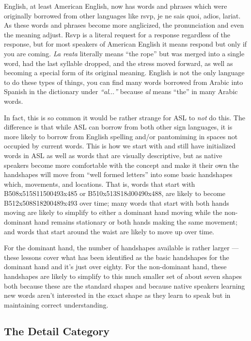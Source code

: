 \documentclass{article}
\begin{document}
English, at least American English, now has words and phrases which were originally borrowed from other languages like rsvp, je ne sais quoi, adios, lariat.
As these words and phrases become more anglicized, the pronunciation and even the meaning adjust.
Rsvp is a literal request for a response regardless of the response, but for most speakers of American English it means respond but only if you are coming.
\emph{La reata} literally means ``the rope'' but was merged into a single word, had the last syllable dropped, and the stress moved forward, as well as becoming a special form of its original meaning.
English is not the only language to do these types of things, you can find many words borrowed from Arabic into Spanish in the dictionary under \emph{``al$\ldots$''} because \emph{al} means ``the'' in many Arabic words.

In fact, this is so common it would be rather strange for ASL to \emph{not} do this.
The difference is that while ASL can borrow from both other sign languages, it is more likely to borrow from English spelling and/or pantomiming in spaces not occupied by current words.
This is how we start with and still have initialized words in ASL as well as words that are visually descriptive, but as native speakers become more comfortable with the concept and make it their own the handshapes will move from ``well formed letters'' into some basic handshapes which, movements, and locations.
That is, words that start with B508x515S11500493x485 or B510x513S18d00490x488, are likely to become B512x508S18200489x493 over time;
many words that start with both hands moving are likely to simplify to either a dominant hand moving while the non-dominant hand remains stationary or both hands making the same movement;
and words that start around the waist are likely to move up over time.

For the dominant hand, the number of handshapes available is rather larger --- these lessons cover what has been identified as the basic handshapes for the dominant hand and it's just over eighty.
For the non-dominant hand, these handshapes are likely to simplify to this much smaller set of about seven shapes both because these are the standard shapes and because native speakers learning new words aren't interested in the exact shape as they learn to speak but in maintaining correct understanding.

\subsection{The Detail Category}
\end{document}
